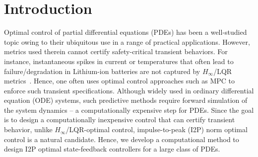 \documentclass[letterpaper, 10 pt, conference]{ieeeconf}
\theoremstyle{definition}
\begin{document}
\begin{abstract}
\end{abstract}


\section{Introduction}

Optimal control of partial differential equations (PDEs) has been a well-studied topic \cite{Moura,vanKeulen,troltzsch2010optimal} owing to their ubiquitous use in a range of practical applications. However, metrics used therein cannot certify safety-critical transient behaviors. For instance, instantaneous spikes in current or temperatures that often lead to failure/degradation in Lithium-ion batteries are not captured by $H_\infty$/LQR metrics~\cite{mouraCST}. Hence, one often uses optimal control approaches such as MPC \cite{Guay} to enforce such transient specifications. Although widely used in ordinary differential equation (ODE) systems, such predictive methods require forward simulation of the system dynamics -- a computationally expensive step for PDEs. Since the goal is to design a computationally inexpensive control that can certify transient behavior, unlike $H_\infty$/LQR-optimal control, impulse-to-peak (I2P) norm optimal control is a natural candidate. Hence, we develop a computational method to design I2P optimal state-feedback controllers for a large class of PDEs.  
\end{document}

